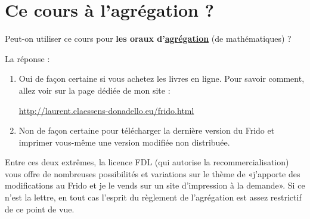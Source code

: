 
\section*{Ce cours à l'agrégation ?}

Peut-on utiliser ce cours pour \textbf{les oraux d'\href{http://agreg.org/}{agrégation}} (de mathématiques) ?

La réponse :
\begin{enumerate}
    \item
        Oui de façon certaine si vous achetez les livres en ligne. Pour savoir comment, allez voir sur la page dédiée de mon site :
        \begin{center}
            \url{http://laurent.claessens-donadello.eu/frido.html}
        \end{center}
    \item
        Non de façon certaine pour télécharger la dernière version du Frido et imprimer vous-même une version modifiée non distribuée.
\end{enumerate}
Entre ces deux extrêmes, la licence FDL (qui autorise la recommercialisation) vous offre de nombreuses possibilités et variations sur le thème de «j'apporte des modifications au Frido et je le vends sur un site d'impression à la demande». Si ce n'est la lettre, en tout cas l'esprit du règlement de l'agrégation est assez restrictif de ce point de vue.
